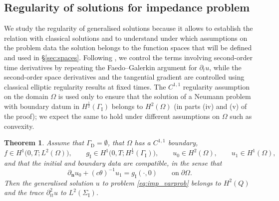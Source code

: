 \documentclass[a4paper]{article}
\theoremstyle{plain}
\newtheorem{theorem}{Theorem}[section]
\theoremstyle{definition}
\newcommand{\TimeDer}{{\partial^{}_t}}
\newcommand{\SecondTimeDer}{{\partial^2_{tt}}}
\newcommand{\NormDer}{{\partial_{\bm{n}}}}
\newcommand{\GD}{{\Gamma_{\mathrm D}}}
\newcommand{\GI}{{\Gamma_{\mathrm I}}}
\newcommand{\SI}{{\Sigma_{\mathrm I}}}
\newcommand{\gI}{{g_{\mathrm I}}}
\begin{document}
\subsection{Regularity of solutions for impedance problem}
We study the regularity of generalised solutions because it allows to establish the relation with classical solutions and to understand under which assumptions on the problem data the solution belongs to the function spaces that will be defined and used in \S\ref{sec:spaces}.
Following \cite[Thm.~IV.4.1]{ladyzhenskaya-bvp}, we control the terms involving second-order time derivatives by repeating the Faedo--Galerkin argument for $\TimeDer u$, while the second-order space derivatives and the tangential gradient are controlled using classical elliptic regularity results at fixed times.
The $C^{1,1}$ regularity assumption on the domain $\Omega$ is used only to ensure that the solution of a Neumann problem with boundary datum in $H^{\frac12}(\GI)$ belongs to $H^2(\Omega)$ (in parts (iv) and (v) of the proof); we expect the same to hold under different assumptions on $\Omega$ such as convexity.

\begin{theorem}
	\label{thm:t_regularity}
	Assume that $\GD=\emptyset$, that $\Omega$ has a $C^{1,1}$ boundary,
	\begin{equation}\label{eq:cond_reg0}
		f\in H^1\big(0,T;L^2(\Omega)\big), \qquad \gI\in H^1\big(0,T;H^\frac12(\GI)\big),
\qquad u_0 \in H^2(\Omega),\qquad u_1 \in H^1(\Omega),
	\end{equation}
	and that the initial and boundary data are compatible, in the sense that \begin{equation}
		\label{eq:compatibility}
		\NormDer u_0 + (c\theta)^{-1} u_1 = \gI(\cdot, 0) \qquad \text{on}\; \partial\Omega.
	\end{equation}
	Then the generalised solution $u$ to problem \eqref{eq:imp_varprob} belongs to $H^2(Q)$ and the trace $\SecondTimeDer u$ to $L^2(\SI)$.

\end{theorem}
\end{document}
